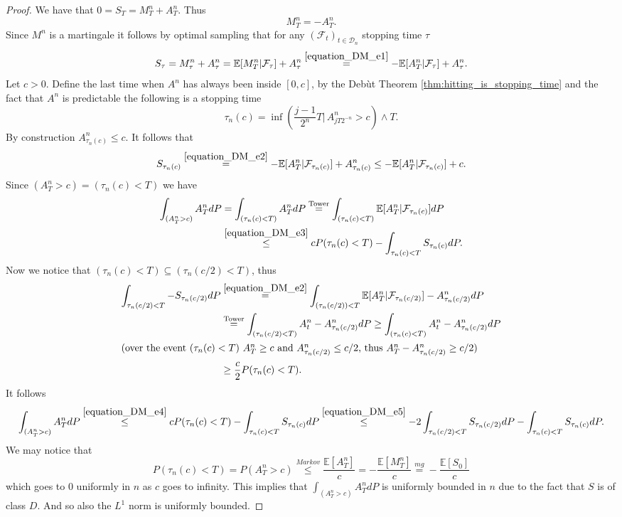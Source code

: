 \begin{proof}
  We have that $0=S_T=M^n_T+A^n_T$. Thus
  \begin{equation}\label{equation_DM_e1}
  M^n_T=-A^n_T.
  \end{equation}
  Since $M^n$ is a martingale it follows by optimal sampling that for any $(\mathcal{F}_t)_{t\in\mathcal{D}_n}$ stopping time $\tau$
  \begin{equation}\label{equation_DM_e2}
  S_\tau=M^n_\tau+A^n_\tau = \mathbb{E}[M^n_T\vert\mathcal{F}_\tau]+A^n_\tau\stackrel{\eqref{equation_DM_e1}}{=} -\mathbb{E}[A^n_T\vert\mathcal{F}_\tau]+A^n_\tau.
  \end{equation}
  Let $c>0$. Define the last time when $A^n$ has always been inside $[0,c]$, by the Debùt Theorem \ref{thm:hitting_is_stopping_time} and the fact that $A^n$ is predictable the following is a stopping time
  $$
  \tau_n(c)=\inf\left(\frac{j-1}{2^n}T\vert\, A^n_{jT2^{-n}}>c\right)\wedge T.
  $$
  By construction $A^n_{\tau_n(c)}\leq c$. It follows that
  \begin{equation}\label{equation_DM_e3}
  S_{\tau_n(c)}\stackrel{\eqref{equation_DM_e2}}{=}-\mathbb{E}[A^n_T\vert\mathcal{F}_{\tau_n(c)}]+A^n_{\tau_n(c)}\leq -\mathbb{E}[A^n_T\vert\mathcal{F}_{\tau_n(c)}]+c.
  \end{equation}
  Since $(A^n_T>c)=(\tau_n(c)<T)$ we have
  \begin{align}\nonumber
  \int_{(A^n_T>c)}A^n_TdP&=\int_{(\tau_n(c)<T)}A^n_TdP\stackrel{\mathrm{Tower}}{=}\int_{(\tau_n(c)<T)}\mathbb{E}[A^n_T\vert\mathcal{F}_{\tau_n(c)}]dP\\
  &\stackrel{\eqref{equation_DM_e3}}{\leq} cP(\tau_n(c)<T)-\int_{\tau_n(c)<T}S_{\tau_n(c)}dP.\label{equation_DM_e4}
  \end{align}
  Now we notice that $(\tau_n(c)<T)\subseteq (\tau_n(c/2)<T)$, thus
  \begin{align}\nonumber
  \int_{\tau_n(c/2)<T}-S_{\tau_n(c/2)}dP&\stackrel{\eqref{equation_DM_e2}}{=}\int_{(\tau_n(c/2))<T}\mathbb{E}[A^n_T\vert\mathcal{F}_{\tau_n(c/2)}]-A^n_{\tau_n(c/2)}dP\\
  &\stackrel{\mathrm{Tower}}{=}\int_{(\tau_n(c/2)<T)}A^n_t-A^n_{\tau_n(c/2)}dP\geq \int_{(\tau_n(c)<T)}A^n_t-A^n_{\tau_n(c/2)}dP\nonumber\\
  \intertext{(over the event $(\tau_n(c)<T)$ $A^n_T\geq c$ and $A^n_{\tau_n(c/2)}\leq c/2$, thus $A^n_T-A^n_{\tau_n(c/2)}\geq c/2$)}
  &\geq \frac{c}{2}P(\tau_n(c)<T).\label{equation_DM_e5}
  \end{align}
  It follows
  $$
  \int_{(A^n_T>c)}A^n_TdP\stackrel{\eqref{equation_DM_e4}}{\leq}cP(\tau_n(c)<T)-\int_{\tau_n(c)<T}S_{\tau_n(c)}dP\stackrel{\eqref{equation_DM_e5}}{\leq}-2\int_{\tau_n(c/2)<T}S_{\tau_n(c/2)}dP-\int_{\tau_n(c)<T}S_{\tau_n(c)}dP.
  $$
  We may notice that
  $$
  P(\tau_n(c)<T)=P(A^n_T>c)\stackrel{Markov}{\leq}\frac{\mathbb{E}[A^n_T]}{c}=-\frac{\mathbb{E}[M^n_T]}{c}\stackrel{mg}{=}-\frac{\mathbb{E}[S_0]}{c}
  $$
  which goes to $0$ uniformly in $n$ as $c$ goes to infinity.
  This implies that $\int_{(A^n_T>c)}A^n_TdP$ is uniformly bounded in $n$ due to the fact that $S$ is of class $D$. And so also the $L^1$ norm is uniformly bounded.
\end{proof}

